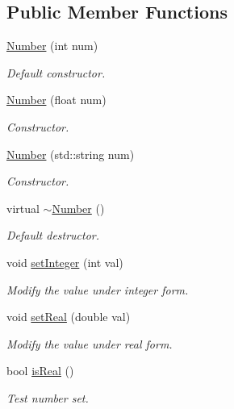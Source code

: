 \subsection*{Public Member Functions}
\begin{DoxyCompactItemize}
\item 
\hyperlink{class_number_a055514cb4cb2727470a83e0df0905489}{Number} (int num)
\begin{DoxyCompactList}\small\item\em Default constructor. \end{DoxyCompactList}\item 
\hyperlink{class_number_a31ddc8a10dbfb7e2267d3e4d7a3b68f3}{Number} (float num)
\begin{DoxyCompactList}\small\item\em Constructor. \end{DoxyCompactList}\item 
\hyperlink{class_number_a2e57aec82986ef3b6700a8a22d4e5163}{Number} (std\-::string num)
\begin{DoxyCompactList}\small\item\em Constructor. \end{DoxyCompactList}\item 
virtual \hyperlink{class_number_a455be1ad651c9a6857276e992f31144c}{$\sim$\-Number} ()
\begin{DoxyCompactList}\small\item\em Default destructor. \end{DoxyCompactList}\item 
void \hyperlink{class_number_a9ddfb581d1ba880bec1f872987a5b031}{set\-Integer} (int val)
\begin{DoxyCompactList}\small\item\em Modify the value under integer form. \end{DoxyCompactList}\item 
void \hyperlink{class_number_a7a685cb10b55b64410086b374e0b5d97}{set\-Real} (double val)
\begin{DoxyCompactList}\small\item\em Modify the value under real form. \end{DoxyCompactList}\item 
bool \hyperlink{class_number_aa506c48f1ed35ea47807a29c8800510c}{is\-Real} ()
\begin{DoxyCompactList}\small\item\em Test number set. \end{DoxyCompactList}\item 

\end{DoxyCompactItemize}
